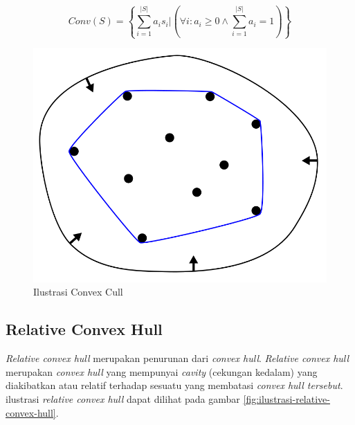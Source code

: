 \begin{equation}
    \label{eq:convex-hull}
    Conv(S)=\left\{ \sum_{i=1}^{|S|}{a_is_i} \big | (\forall{i}:a_i \ge 0 \wedge \sum_{i=1}^{|S|}{a_i=1} ) \right\}
\end{equation}
\begin{figure}
	\Centering
	\includegraphics [width=0.5\columnwidth]{bab2/img/ilustrasi-convex-hull}
	\caption {Ilustrasi Convex Cull}
	\label {fig:ilustrasi-convex-hull}
\end{figure}


\subsection{Relative Convex Hull}
\textit{Relative convex hull} merupakan penurunan dari \textit{convex hull}. \textit{Relative convex hull} merupakan \textit{convex hull} yang mempunyai \textit{cavity} (cekungan kedalam) yang diakibatkan atau relatif terhadap sesuatu yang membatasi \textit{convex hull tersebut}. ilustrasi \textit{relative convex hull} dapat dilihat pada gambar \ref{fig:ilustrasi-relative-convex-hull}.


